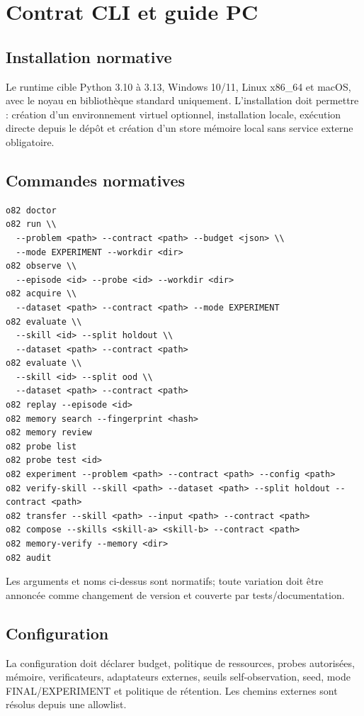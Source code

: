 \documentclass[11pt,a4paper]{report}
\begin{document}
\chapter{Contrat CLI et guide PC}
\section{Installation normative}
Le runtime cible Python 3.10 à 3.13, Windows 10/11, Linux x86\_64 et macOS, avec le noyau en bibliothèque standard uniquement. L'installation doit permettre : création d'un environnement virtuel optionnel, installation locale, exécution directe depuis le dépôt et création d'un store mémoire local sans service externe obligatoire.

\section{Commandes normatives}
\begin{verbatim}
o82 doctor
o82 run \\
  --problem <path> --contract <path> --budget <json> \\
  --mode EXPERIMENT --workdir <dir>
o82 observe \\
  --episode <id> --probe <id> --workdir <dir>
o82 acquire \\
  --dataset <path> --contract <path> --mode EXPERIMENT
o82 evaluate \\
  --skill <id> --split holdout \\
  --dataset <path> --contract <path>
o82 evaluate \\
  --skill <id> --split ood \\
  --dataset <path> --contract <path>
o82 replay --episode <id>
o82 memory search --fingerprint <hash>
o82 memory review
o82 probe list
o82 probe test <id>
o82 experiment --problem <path> --contract <path> --config <path>
o82 verify-skill --skill <path> --dataset <path> --split holdout --contract <path>
o82 transfer --skill <path> --input <path> --contract <path>
o82 compose --skills <skill-a> <skill-b> --contract <path>
o82 memory-verify --memory <dir>
o82 audit\end{verbatim}
Les arguments et noms ci-dessus sont normatifs; toute variation doit être annoncée comme changement de version et couverte par tests/documentation.

\section{Configuration}
La configuration doit déclarer budget, politique de ressources, probes autorisées, mémoire, verificateurs, adaptateurs externes, seuils self-observation, seed, mode FINAL/EXPERIMENT et politique de rétention. Les chemins externes sont résolus depuis une allowlist.
\end{document}
